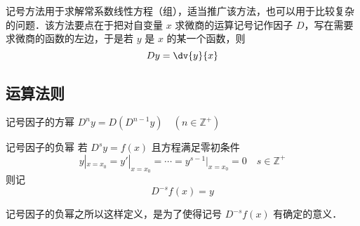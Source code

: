 \begin{issues}
\issueDraft
\end{issues}

记号方法用于求解常系数线性方程（组），适当推广该方法，也可以用于比较复杂的问题．该方法要点在于把对自变量 $x$ 求微商的运算记号记作因子 $D$，写在需要求微商的函数的左边，于是若 $y$ 是 $x$ 的某一个函数，则
\begin{equation}
Dy=\dv{y}{x}
\end{equation}
\subsection{运算法则}
\begin{definition}{记号因子的方幂}\label{Sign_def1}
$D^ny=D(D^{n-1}y)\quad(n\in\mathbb{Z^{+}})$
\end{definition}
\begin{definition}{记号因子的负幂}\label{Sign_def2}
若 $D^sy=f(x)$ 且方程满足零初条件
\begin{equation}\label{Sign_eq5}
y|_{x=x_0}=y'|_{x=x_0}=\cdots=y^{s-1}|_{x=x_0}=0\quad{s\in\mathbb{Z^{+}}}
\end{equation}
则记
\begin{equation}
D^{-s}f(x)=y
\end{equation}
\end{definition}
记号因子的负幂之所以这样定义，是为了使得记号 $D^{-s}f(x)$ 有确定的意义．

